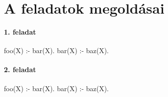 \chapter{A feladatok megoldásai}
\subsubsection*{1. feladat}
\begin{prolog}
foo(X) :- bar(X).
bar(X) :- baz(X).
\end{prolog}
\subsubsection*{2. feladat}
\begin{prolog}
foo(X) :- bar(X).
bar(X) :- baz(X).
\end{prolog}
